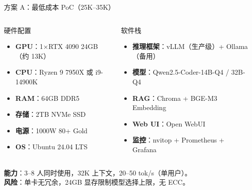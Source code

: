 \documentclass[UTF8,11pt,aspectratio=169]{beamer}
\begin{document}
\begin{frame}{方案 A：最低成本 PoC（\textyen{}25K--\textyen{}35K）}
  \small
  \begin{columns}[T]
    \begin{block}{硬件配置}
      \begin{itemize}
        \item \textbf{GPU}：1$\times$RTX 4090 24GB（约 \textyen{}13K）
        \item \textbf{CPU}：Ryzen 9 7950X 或 i9-14900K
        \item \textbf{RAM}：64GB DDR5
        \item \textbf{存储}：2TB NVMe SSD
        \item \textbf{电源}：1000W 80+ Gold
        \item \textbf{OS}：Ubuntu 24.04 LTS
      \end{itemize}
    \end{block}

    \begin{block}{软件栈}
      \begin{itemize}
        \item \textbf{推理框架}：vLLM（生产级）+ Ollama（备用）
        \item \textbf{模型}：Qwen2.5-Coder-14B-Q4 / 32B-Q4
        \item \textbf{RAG}：Chroma + BGE-M3 Embedding
        \item \textbf{Web UI}：Open WebUI
        \item \textbf{监控}：nvitop + Prometheus + Grafana
      \end{itemize}
    \end{block}
  \end{columns}

  \vspace{0.3em}
  \textbf{能力}：3--8 人同时使用，32K 上下文，20--50 tok/s（单用户）。\\
  \textbf{风险}：单卡无冗余，24GB 显存限制模型选择上限，无 ECC。
\end{frame}
\end{document}
